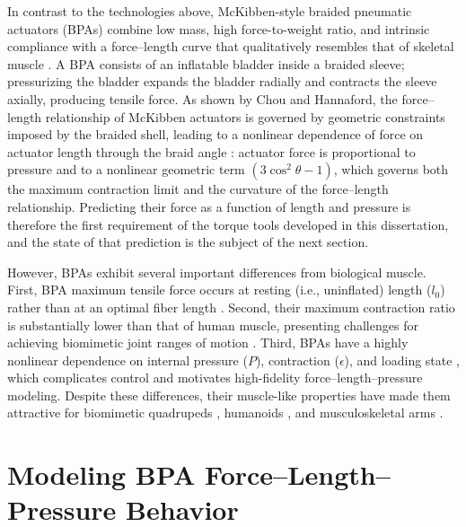 In contrast to the technologies above, McKibben-style braided pneumatic actuators (BPAs) combine low mass, high force-to-weight ratio, and intrinsic compliance with a force--length curve that qualitatively resembles that of skeletal muscle \citep{liang_comparative_2020, hunt_modeling_2017}. A BPA consists of an inflatable bladder inside a braided sleeve; pressurizing the bladder expands the bladder radially and contracts the sleeve axially, producing tensile force. As shown by Chou and Hannaford, the force--length relationship of McKibben actuators is governed by geometric constraints imposed by the braided shell, leading to a nonlinear dependence of force on actuator length through the braid angle \citep{chou_measurement_1996}: actuator force is proportional to pressure and to a nonlinear geometric term $(3\cos^2\theta - 1)$, which governs both the maximum contraction limit and the curvature of the force--length relationship. Predicting their force as a function of length and pressure is therefore the first requirement of the torque tools developed in this dissertation, and the state of that prediction is the subject of the next section.

However, BPAs exhibit several important differences from biological muscle. First, BPA maximum tensile force occurs at resting (i.e., uninflated) length ($l_0$) rather than at an optimal fiber length \citep{liang_comparative_2020}. Second, their maximum contraction ratio is substantially lower than that of human muscle, presenting challenges for achieving biomimetic joint ranges of motion \citep{hunt_modeling_2017, sarosi_comparative_2017, liang_comparative_2020}. Third, BPAs have a highly nonlinear dependence on internal pressure ($P$), contraction ($\epsilon$), and loading state \citep{hunt_modeling_2017, martens_modeling_2017}, which complicates control and motivates high-fidelity force--length--pressure modeling. Despite these differences, their muscle-like properties have made them attractive for biomimetic quadrupeds \citep{aschenbeck_design_2006, scharzenberger_design_2019}, humanoids \citep{asano_design_2017, hitzmann_anthropomorphic_2018}, and musculoskeletal arms \citep{kurumaya_musculoskeletal_2016, chen_realizing_2019}.

\section{Modeling BPA Force--Length--Pressure Behavior}\label{sec:bg_bpamodels}

